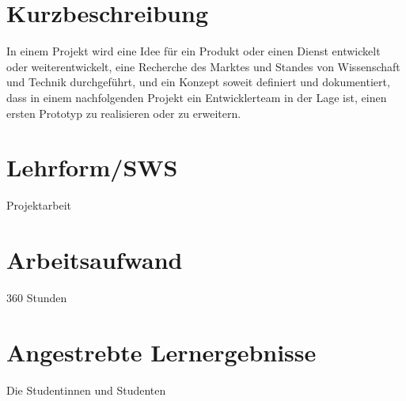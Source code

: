 \section*{Kurzbeschreibung\label{/mi-2017/modulbeschreibungen-master/MA_Modul_Projekt_Vision&Konzept}}\label{kurzbeschreibungpathlabelmi-2017modulbeschreibungen-mastermaux5fmodulux5fprojektux5fvisionkonzept}

In einem Projekt wird eine Idee für ein Produkt oder einen Dienst
entwickelt oder weiterentwickelt, eine Recherche des Marktes und Standes
von Wissenschaft und Technik durchgeführt, und ein Konzept soweit
definiert und dokumentiert, dass in einem nachfolgenden Projekt ein
Entwicklerteam in der Lage ist, einen ersten Prototyp zu realisieren
oder zu erweitern.

\section*{Lehrform/SWS\label{/mi-2017/modulbeschreibungen-master/MA_Modul_Projekt_Vision&Konzept}}\label{lehrformswspathlabelmi-2017modulbeschreibungen-mastermaux5fmodulux5fprojektux5fvisionkonzept}

Projektarbeit

\section*{Arbeitsaufwand\label{/mi-2017/modulbeschreibungen-master/MA_Modul_Projekt_Vision&Konzept}}\label{arbeitsaufwandpathlabelmi-2017modulbeschreibungen-mastermaux5fmodulux5fprojektux5fvisionkonzept}

360 Stunden

\section*{Angestrebte
Lernergebnisse\label{/mi-2017/modulbeschreibungen-master/MA_Modul_Projekt_Vision&Konzept}}\label{angestrebte-lernergebnissepathlabelmi-2017modulbeschreibungen-mastermaux5fmodulux5fprojektux5fvisionkonzept}

Die Studentinnen und Studenten

